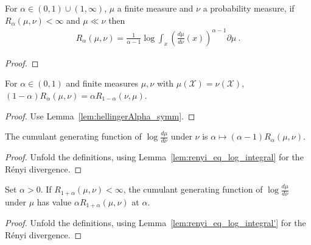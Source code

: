 \begin{lemma}
  \label{lem:renyi_eq_log_integral'}
  \leanok
  For $\alpha \in (0,1)\cup(1, \infty)$, $\mu$ a finite measure and $\nu$ a probability measure, if $R_\alpha(\mu, \nu) < \infty$ and $\mu \ll \nu$ then
  \begin{align*}
  R_\alpha(\mu, \nu) = \frac{1}{\alpha - 1} \log \int_x \left(\frac{d \mu}{d \nu}(x)\right)^{\alpha - 1} \partial \mu
  \: .
  \end{align*}
\end{lemma}

\begin{proof}\leanok
{}
\end{proof}

\begin{lemma}
  \label{lem:renyi_symm}
  \leanok
  For $\alpha \in (0, 1)$ and finite measures $\mu, \nu$ with $\mu(\mathcal X) = \nu(\mathcal X)$, $(1 - \alpha) R_\alpha(\mu, \nu) = \alpha R_{1 - \alpha}(\nu, \mu)$.
\end{lemma}

\begin{proof}\leanok
{}
Use Lemma~\ref{lem:hellingerAlpha_symm}.
\end{proof}

\begin{lemma}
  \label{lem:renyi_cgf}
  \leanok
  The cumulant generating function of $\log\frac{d\mu}{d\nu}$ under $\nu$ is $\alpha \mapsto (\alpha - 1) R_\alpha(\mu, \nu)$.
\end{lemma}

\begin{proof}\leanok
{}
Unfold the definitions, using Lemma~\ref{lem:renyi_eq_log_integral} for the Rényi divergence.
\end{proof}

\begin{lemma}
  \label{lem:renyi_cgf_2}
  \leanok
  Set $\alpha > 0$. If $R_{1+\alpha}(\mu, \nu) < \infty$, the cumulant generating function of $\log\frac{d\mu}{d\nu}$ under $\mu$ has value $\alpha R_{1+\alpha}(\mu, \nu)$ at $\alpha$.
\end{lemma}

\begin{proof}\leanok
{}
Unfold the definitions, using Lemma~\ref{lem:renyi_eq_log_integral'} for the Rényi divergence.
\end{proof}

